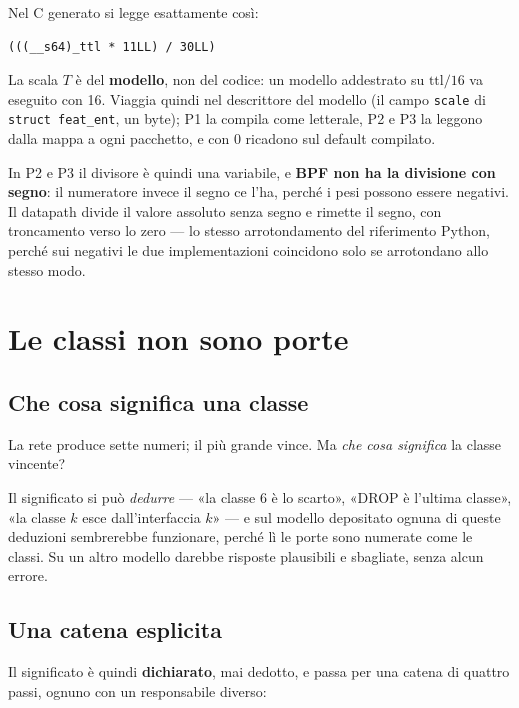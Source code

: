 \documentclass[11pt,a4paper,oneside]{report}
\begin{document}
Nel C generato si legge esattamente così:
\begin{lstlisting}
(((__s64)_ttl * 11LL) / 30LL)
\end{lstlisting}

La scala $T$ è del \textbf{modello}, non del codice: un modello addestrato su
$\text{ttl}/16$ va eseguito con 16. Viaggia quindi nel descrittore del modello
(il campo \texttt{scale} di \texttt{struct feat\_ent}, un byte); P1 la compila
come letterale, P2 e P3 la leggono dalla mappa a ogni pacchetto, e con 0
ricadono sul default compilato.

In P2 e P3 il divisore è quindi una variabile, e \textbf{BPF non ha la divisione
con segno}: il numeratore invece il segno ce l'ha, perché i pesi possono essere
negativi. Il datapath divide il valore assoluto senza segno e rimette il segno,
con troncamento verso lo zero --- lo stesso arrotondamento del riferimento
Python, perché sui negativi le due implementazioni coincidono solo se
arrotondano allo stesso modo.

\chapter{Le classi non sono porte}
\label{ch:classi}

\section{Che cosa significa una classe}

La rete produce sette numeri; il più grande vince. Ma \emph{che cosa significa}
la classe vincente?

Il significato si può \emph{dedurre} --- «la classe 6 è lo scarto», «DROP è
l'ultima classe», «la classe $k$ esce dall'interfaccia $k$» --- e sul modello
depositato ognuna di queste deduzioni sembrerebbe funzionare, perché lì le
porte sono numerate come le classi. Su un altro modello darebbe risposte
plausibili e sbagliate, senza alcun errore.

\section{Una catena esplicita}

Il significato è quindi \textbf{dichiarato}, mai dedotto, e passa per una
catena di quattro passi, ognuno con un responsabile diverso:
\end{document}
